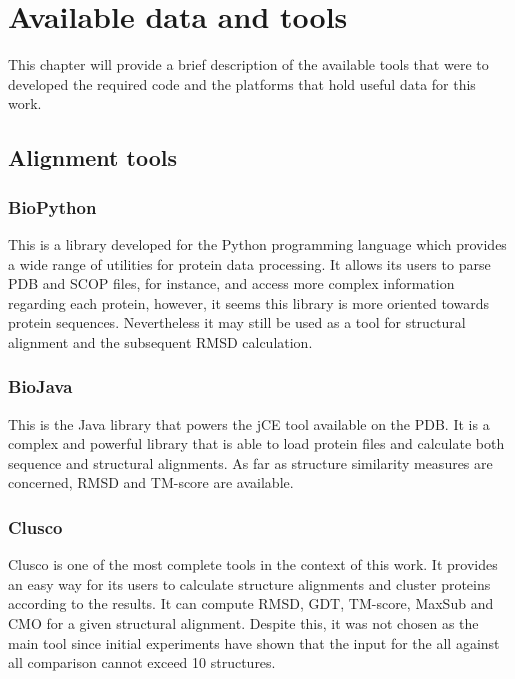 \chapter{Available data and tools} 

This chapter will provide a brief description of the available tools that were to developed the required code and the platforms that hold useful data for this work. 

\section{Alignment tools}

\subsection{BioPython}

\cite{cock2009biopython}

This is a library developed for the Python programming language which provides a wide range of utilities for protein data processing. It allows its users to parse PDB and SCOP files, for instance, and access more complex information regarding each protein, however, it seems this library is more oriented towards protein sequences. Nevertheless it may still be used as a tool for structural alignment and the subsequent RMSD calculation.

\subsection{BioJava}

\cite{holland2008biojava}

This is the Java library that powers the jCE tool available on the PDB. It is a complex and powerful library that is able to load protein files and calculate both sequence and structural alignments. As far as structure similarity measures are concerned, RMSD and TM-score are available. 

\subsection{Clusco}

\cite{jamroz2013clusco}

Clusco is one of the most complete tools in the context of this work. It provides an easy way for its users to calculate structure alignments and cluster proteins according to the results. It can compute RMSD, GDT, TM-score, MaxSub and CMO for a given structural alignment. Despite this, it was not chosen as the main tool since initial experiments have shown that the input for the all against all comparison cannot exceed 10 structures.

